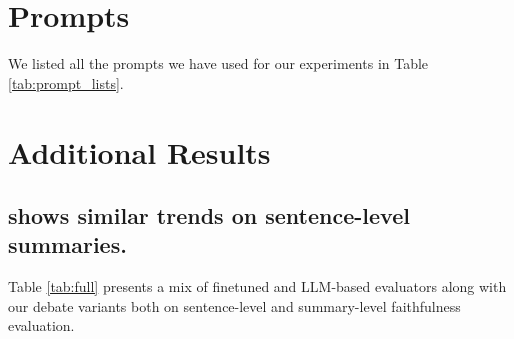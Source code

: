 \section{Prompts}\label{app:prompts}
We listed all the prompts we have used for our experiments in Table \ref{tab:prompt_lists}.













\section{Additional Results}\label{app:result}
\subsection{\method shows similar trends on sentence-level summaries.}\label{app:full_results}
Table \ref{tab:full} presents a mix of finetuned and LLM-based evaluators along with our debate variants both on sentence-level and summary-level faithfulness evaluation.


